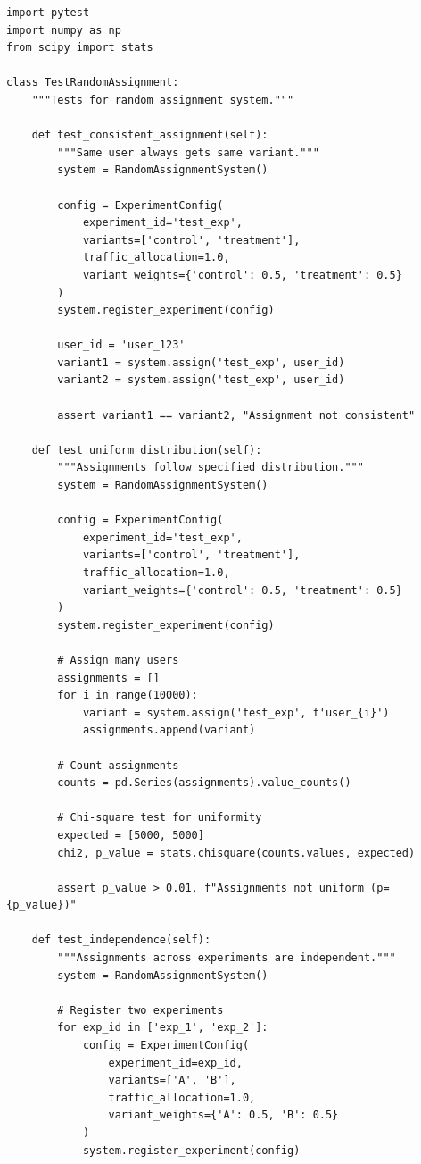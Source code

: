 \lstset{language=Python, caption=Unit Tests for Experiment System}
\begin{lstlisting}
import pytest
import numpy as np
from scipy import stats

class TestRandomAssignment:
    """Tests for random assignment system."""

    def test_consistent_assignment(self):
        """Same user always gets same variant."""
        system = RandomAssignmentSystem()

        config = ExperimentConfig(
            experiment_id='test_exp',
            variants=['control', 'treatment'],
            traffic_allocation=1.0,
            variant_weights={'control': 0.5, 'treatment': 0.5}
        )
        system.register_experiment(config)

        user_id = 'user_123'
        variant1 = system.assign('test_exp', user_id)
        variant2 = system.assign('test_exp', user_id)

        assert variant1 == variant2, "Assignment not consistent"

    def test_uniform_distribution(self):
        """Assignments follow specified distribution."""
        system = RandomAssignmentSystem()

        config = ExperimentConfig(
            experiment_id='test_exp',
            variants=['control', 'treatment'],
            traffic_allocation=1.0,
            variant_weights={'control': 0.5, 'treatment': 0.5}
        )
        system.register_experiment(config)

        # Assign many users
        assignments = []
        for i in range(10000):
            variant = system.assign('test_exp', f'user_{i}')
            assignments.append(variant)

        # Count assignments
        counts = pd.Series(assignments).value_counts()

        # Chi-square test for uniformity
        expected = [5000, 5000]
        chi2, p_value = stats.chisquare(counts.values, expected)

        assert p_value > 0.01, f"Assignments not uniform (p={p_value})"

    def test_independence(self):
        """Assignments across experiments are independent."""
        system = RandomAssignmentSystem()

        # Register two experiments
        for exp_id in ['exp_1', 'exp_2']:
            config = ExperimentConfig(
                experiment_id=exp_id,
                variants=['A', 'B'],
                traffic_allocation=1.0,
                variant_weights={'A': 0.5, 'B': 0.5}
            )
            system.register_experiment(config)


\end{lstlisting}
